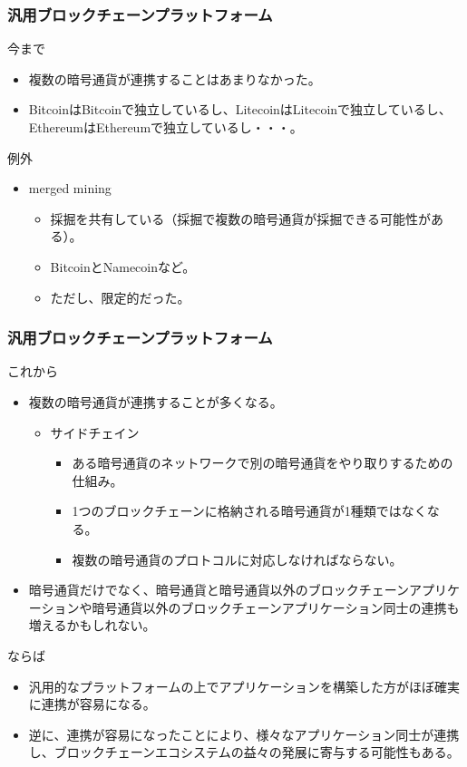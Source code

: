 \documentclass[dvipdfmx,9pt,notheorems]{beamer}
\theoremstyle{definition}
\begin{document}
\begin{frame}\frametitle{汎用ブロックチェーンプラットフォーム}
\begin{block}{今まで}
\begin{itemize}
 \item 複数の暗号通貨が連携することはあまりなかった。
 \item BitcoinはBitcoinで独立しているし、LitecoinはLitecoinで独立しているし、EthereumはEthereumで独立しているし・・・。
\end{itemize}
\end{block}
\begin{alertblock}{例外}
\begin{itemize}
 \item[] merged mining
 \begin{itemize}
  \item 採掘を共有している（採掘で複数の暗号通貨が採掘できる可能性がある）。
  \item BitcoinとNamecoinなど。
  \item ただし、限定的だった。
 \end{itemize}
\end{itemize}
\end{alertblock}
\end{frame}

\begin{frame}\frametitle{汎用ブロックチェーンプラットフォーム}
\begin{block}{これから}
\begin{itemize}
 \item 複数の暗号通貨が連携することが多くなる。
 \begin{itemize}
  \item サイドチェイン
  \begin{itemize}
   \item ある暗号通貨のネットワークで別の暗号通貨をやり取りするための仕組み。
   \item 1つのブロックチェーンに格納される暗号通貨が1種類ではなくなる。
   \item 複数の暗号通貨のプロトコルに対応しなければならない。
  \end{itemize}
 \end{itemize}
 \item 暗号通貨だけでなく、暗号通貨と暗号通貨以外のブロックチェーンアプリケーションや暗号通貨以外のブロックチェーンアプリケーション同士の連携も増えるかもしれない。
\end{itemize}
\end{block}
\begin{alertblock}{ならば}
\begin{itemize}
 \item 汎用的なプラットフォームの上でアプリケーションを構築した方がほぼ確実に連携が容易になる。
 \item 逆に、連携が容易になったことにより、様々なアプリケーション同士が連携し、ブロックチェーンエコシステムの益々の発展に寄与する可能性もある。
\end{itemize}
\end{alertblock}
\end{frame}
\end{document}

